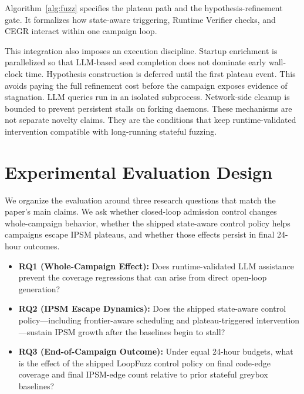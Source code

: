 \documentclass[conference]{IEEEtran}
\begin{document}
Algorithm~\ref{alg:fuzz} specifies the plateau path and the hypothesis-refinement gate. It formalizes how state-aware triggering, Runtime Verifier checks, and CEGR interact within one campaign loop.

This integration also imposes an execution discipline. Startup enrichment is parallelized so that LLM-based seed completion does not dominate early wall-clock time. Hypothesis construction is deferred until the first plateau event. This avoids paying the full refinement cost before the campaign exposes evidence of stagnation. LLM queries run in an isolated subprocess. Network-side cleanup is bounded to prevent persistent stalls on forking daemons. These mechanisms are not separate novelty claims. They are the conditions that keep runtime-validated intervention compatible with long-running stateful fuzzing.

\section{Experimental Evaluation Design}

We organize the evaluation around three research questions that match the paper's main claims. We ask whether closed-loop admission control changes whole-campaign behavior, whether the shipped state-aware control policy helps campaigns escape IPSM plateaus, and whether those effects persist in final 24-hour outcomes.
\begin{itemize}
    \item \textbf{RQ1 (Whole-Campaign Effect):} Does runtime-validated LLM assistance prevent the coverage regressions that can arise from direct open-loop generation?
    \item \textbf{RQ2 (IPSM Escape Dynamics):} Does the shipped state-aware control policy---including frontier-aware scheduling and plateau-triggered intervention---sustain IPSM growth after the baselines begin to stall?
    \item \textbf{RQ3 (End-of-Campaign Outcome):} Under equal 24-hour budgets, what is the effect of the shipped LoopFuzz control policy on final code-edge coverage and final IPSM-edge count relative to prior stateful greybox baselines?
\end{itemize}
\end{document}
